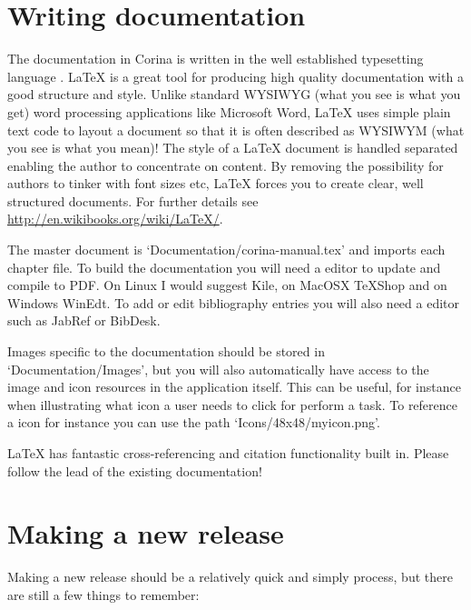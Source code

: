 \section{Writing documentation}
The documentation in Corina is written in the well established typesetting language {\LaTeXe}.  {\LaTeX} is a great tool for producing high quality documentation with a good structure and style.  Unlike standard WYSIWYG (what you see is what you get) word processing applications like Microsoft Word, {\LaTeX} uses simple plain text code to layout a document so that it is often described as WYSIWYM (what you see is what you mean)!  The style of a {\LaTeX} document is handled separated enabling the author to concentrate on content.  By removing the possibility for authors to tinker with font sizes etc, {\LaTeX} forces you to create clear, well structured documents.  For further details see \url{http://en.wikibooks.org/wiki/LaTeX/}.

The master document is `Documentation/corina-manual.tex' and imports each chapter file.  To build the documentation you will need a editor to update and compile to PDF.  On Linux I would suggest Kile, on MacOSX TeXShop and on Windows WinEdt.  To add or edit bibliography entries you will also need a {\BibTeX} editor such as JabRef or BibDesk.

Images specific to the documentation should be stored in `Documentation/Images', but you will also automatically have access to the image and icon resources in the application itself.  This can be useful, for instance when illustrating what icon a user needs to click for perform a task.  To reference a icon for instance you can use the path `Icons/48x48/myicon.png'.

{\LaTeX} has fantastic cross-referencing and citation functionality built in.  Please follow the lead of the existing documentation!


\section{Making a new release}
Making a new release should be a relatively quick and simply process, but there are still a few things to remember:

